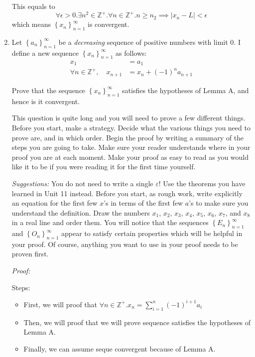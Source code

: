 \documentclass[12pt]{exam}
\newcommand {\DS} [1] {${\displaystyle #1}$}
\newcommand{\vv}{\vspace{.1cm}}
\newcommand{\Z}{\mathbb{Z}}
\newcommand{\e}{\varepsilon}
\begin{document}
\begin{enumerate}
This equals to
$$
\forall \epsilon > 0. \exists n^2\in\Z^+.\forall n \in \Z^+. n \geq n_2 \implies | x_n - L | < \epsilon
$$
which means \DS{\left\{x_n\right\}_{n=1}^{\infty}} is convergent.

\newpage

\item Let \DS{\left\{a_n\right\}_{n=1}^{\infty}} be a \emph{decreasing} sequence of positive numbers with limit $0$.  I define a new sequence \DS{\left\{x_n\right\}_{n=1}^{\infty}} as follows:
	$$
	\begin{aligned}
		x_1 &= a_1 \\
		\forall n \in \Z^+, \quad x_{n+1} &= x_n + (-1)^n a_{n+1}
	\end{aligned}
	$$
	
	 Prove that the sequence \DS{\left\{x_n\right\}_{n=1}^{\infty}} satisfies the hypotheses of Lemma A, and hence is it convergent.

	This question is quite long and you will need to prove a few different things.  Before you start, make a strategy.  Decide what the various things you need to prove are, and in which order.  Begin the proof by writing a summary of the steps you are going to take.  Make sure your reader understands where in your proof you are at each moment.  Make your proof as easy to read as you would like it to be if you were reading it for the first time yourself.
		 
	 \emph{Suggestions:}  You do not need to write a single $\e$!  Use the theorems you have learned in Unit 11 instead.
	 Before you start, as rough work, write explicitly an equation for the first few $x$'s in terms of the first few $a$'s to make sure you understand the definition.  Draw the numbers $x_1$, $x_2$, $x_3$, $x_4$, $x_5$, $x_6$, $x_7$, and $x_8$ in a real line and order them.   You will notice that the sequences \DS{\left\{E_n\right\}_{n=1}^{\infty}}  and \DS{\left\{O_n\right\}_{n=1}^{\infty}} appear to satisfy certain properties which will be helpful in your proof.  Of course, anything you want to use in your proof needs to be proven first.
	
\vv

\emph{Proof:}

Steps:

\begin{itemize}
	\item First, we will proof that $\forall n\in\Z^+. x_n=\sum_{i=1}^n(-1)^{i+1}a_i$
	\item Then, we will proof that we will prove sequence satisfies the hypotheses of Lemma A.
	\item Finally, we can assume seque convergent because of Lemma A.
\end{itemize}
    


\end{enumerate}
\end{document}
